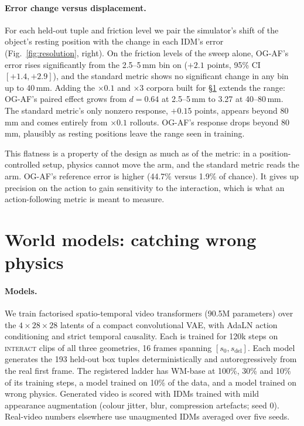 \documentclass[10pt]{article}
\newcommand{\sdel}{s_{\mathrm{del}}}
\newcommand{\cond}[1]{\textsc{#1}}
\begin{document}
\paragraph{Error change versus displacement.} For each held-out tuple and friction
level we pair the simulator's shift of the object's resting position with the change in
each IDM's error (Fig.~\ref{fig:resolution}, right). On the friction levels of the sweep
alone, OG-AF's error rises significantly from the 2.5--5\,mm bin on
($+2.1$ points, 95\% CI $[+1.4,+2.9]$), and the standard metric shows no significant
change in any bin up to 40\,mm. Adding the $\times0.1$ and $\times3$ corpora built for
\S\ref{sec:wm} extends the range: OG-AF's paired effect grows from $d=0.64$ at
2.5--5\,mm to 3.27 at 40--80\,mm. The standard metric's only nonzero response,
$+0.15$ points, appears beyond 80\,mm and comes entirely from $\times0.1$ rollouts.
OG-AF's response drops beyond 80\,mm, plausibly as resting positions leave the range seen
in training.

This flatness is a property of the design as much as of the metric: in a
position-controlled setup, physics cannot move the arm, and the standard metric reads
the arm. OG-AF's reference error is higher (44.7\% versus 1.9\% of chance). It gives up
precision on the action to gain sensitivity to the interaction, which is what an
action-following metric is meant to measure.

\section{World models: catching wrong physics}
\label{sec:wm}

\paragraph{Models.} We train factorised spatio-temporal video transformers (90.5M
parameters) over the $4\times28\times28$ latents of a compact convolutional VAE, with
AdaLN action conditioning and strict temporal causality. Each is trained for 120k steps
on \cond{interact} clips of all three geometries, 16 frames spanning $[s_0,\sdel]$. Each
model generates the 193 held-out box tuples deterministically and autoregressively from
the real first frame. The registered ladder has WM-base at 100\%, 30\% and 10\% of its
training steps, a model trained on 10\% of the data, and a model trained on wrong
physics. Generated video is scored with IDMs trained with mild appearance augmentation
(colour jitter, blur, compression artefacts; seed 0). Real-video numbers elsewhere use
unaugmented IDMs averaged over five seeds.
\end{document}
